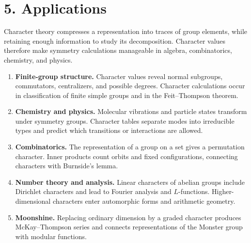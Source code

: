 \section*{5. Applications}
Character theory compresses a representation into traces of group elements, while retaining enough information to study its decomposition. Character values therefore make symmetry calculations manageable in algebra, combinatorics, chemistry, and physics.
\begin{enumerate}[leftmargin=*,itemsep=0.35em]
\item \textbf{Finite-group structure.} Character values reveal normal subgroups, commutators, centralizers, and possible degrees. Character calculations occur in classification of finite simple groups and in the Feit--Thompson theorem.
\item \textbf{Chemistry and physics.} Molecular vibrations and particle states transform under symmetry groups. Character tables separate modes into irreducible types and predict which transitions or interactions are allowed.
\item \textbf{Combinatorics.} The representation of a group on a set gives a permutation character. Inner products count orbits and fixed configurations, connecting characters with Burnside's lemma.
\item \textbf{Number theory and analysis.} Linear characters of abelian groups include Dirichlet characters and lead to Fourier analysis and $L$-functions. Higher-dimensional characters enter automorphic forms and arithmetic geometry.
\item \textbf{Moonshine.} Replacing ordinary dimension by a graded character produces McKay--Thompson series and connects representations of the Monster group with modular functions.
\end{enumerate}



